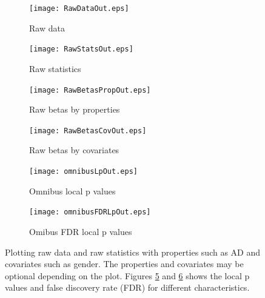 \documentclass[]{spie}  %
\begin{document}
\begin{figure}
	\centering
	\begin{subfigure}{0.45\textwidth}
		\texttt{[image: RawDataOut.eps]}
	   	\caption{Raw data}
	   	\label{fig:RawData}
	\end{subfigure}
	\begin{subfigure}{0.45\textwidth}
		\texttt{[image: RawStatsOut.eps]}
	   	\caption{Raw statistics}
	   	\label{fig:RawStats}
	\end{subfigure}

	\begin{subfigure}{0.45\textwidth}
		\texttt{[image: RawBetasPropOut.eps]}
	   	\caption{Raw betas by properties}
	   	\label{fig:RawBetasProp}
	\end{subfigure}
	\begin{subfigure}{0.45\textwidth}
		\texttt{[image: RawBetasCovOut.eps]}
	   	\caption{Raw betas by covariates}
	   	\label{fig:RawBetasCov}
	\end{subfigure}

	\begin{subfigure}{0.45\textwidth}
		\texttt{[image: omnibusLpOut.eps]}
	   	\caption{Omnibus local p values}
	   	\label{fig:omnibusLp}
	\end{subfigure}
	\begin{subfigure}{0.45\textwidth}
		\texttt{[image: omnibusFDRLpOut.eps]}
	   	\caption{Omibus FDR local p values}
	   	\label{fig:omnibusFDRLp}
	\end{subfigure}

	\label{fig:rawomnibus}
	\caption{Plotting raw data and raw statistics with properties such as AD and covariates such as gender.
	The properties and covariates may be optional depending on the plot.
	Figures \ref{fig:omnibusLp} and \ref{fig:omnibusFDRLp} shows the local p values and false discovery rate (FDR) for 
	different characteristics.}
\end{figure}
\end{document}
